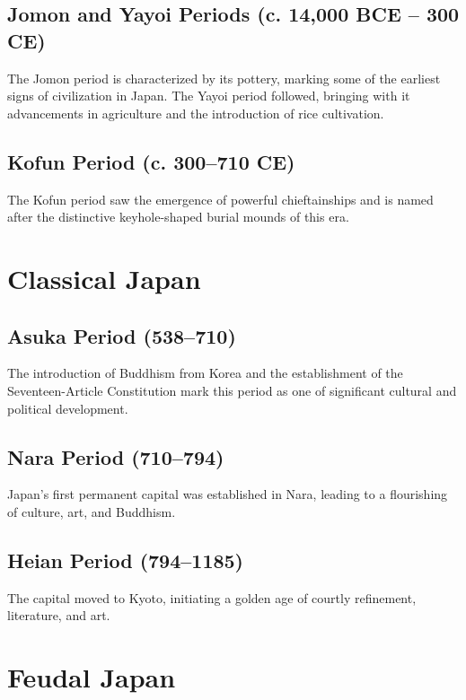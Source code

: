 \documentclass{book}
\begin{document}
\subsection{Jomon and Yayoi Periods (c. 14,000 BCE – 300 CE)}
\label{subsec:jomon-yayoi-periods}
The Jomon period is characterized by its pottery, marking some of the earliest signs of civilization in Japan. The Yayoi period followed, bringing with it advancements in agriculture and the introduction of rice cultivation.

\subsection{Kofun Period (c. 300–710 CE)}
\label{subsec:kofun-period}
The Kofun period saw the emergence of powerful chieftainships and is named after the distinctive keyhole-shaped burial mounds of this era.

\section{Classical Japan}
\label{sec:classical-japan}

\subsection{Asuka Period (538–710)}
\label{subsec:asuka-period}
The introduction of Buddhism from Korea and the establishment of the Seventeen-Article Constitution mark this period as one of significant cultural and political development.

\subsection{Nara Period (710–794)}
\label{subsec:nara-period}
Japan's first permanent capital was established in Nara, leading to a flourishing of culture, art, and Buddhism.

\subsection{Heian Period (794–1185)}
\label{subsec:heian-period}
The capital moved to Kyoto, initiating a golden age of courtly refinement, literature, and art.

\section{Feudal Japan}
\label{sec:feudal-japan}
\end{document}
